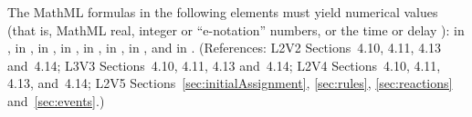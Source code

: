 The MathML formulas in the following elements must yield numerical
values (that is, MathML real, integer or ``e-notation'' numbers,
or the time or delay ):  in \KineticLaw,
 in \SpeciesReference,  in
\InitialAssignment,  in \AssignmentRule,  in
\RateRule,  in \AlgebraicRule,  in \Event
\Delay, and  in \EventAssignment.  (References: L2V2
Sections~4.10, 4.11, 4.13 and~4.14; L3V3 Sections~4.10, 4.11, 4.13 
and~4.14; L2V4 Sections~4.10, 4.11, 4.13, and~4.14; L2V5 Sections~\ref{sec:initialAssignment}, \ref{sec:rules}, 
\ref{sec:reactions} and~\ref{sec:events}.)


